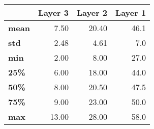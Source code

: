 \begin{tabular}{lrrr}
\toprule
{} &  Layer 3 &  Layer 2 &  Layer 1 \\
\midrule
\textbf{mean} &     7.50 &    20.40 &     46.1 \\
\textbf{std } &     2.48 &     4.61 &      7.0 \\
\textbf{min } &     2.00 &     8.00 &     27.0 \\
\textbf{25\% } &     6.00 &    18.00 &     44.0 \\
\textbf{50\% } &     8.00 &    20.50 &     47.5 \\
\textbf{75\% } &     9.00 &    23.00 &     50.0 \\
\textbf{max } &    13.00 &    28.00 &     58.0 \\
\bottomrule
\end{tabular}
